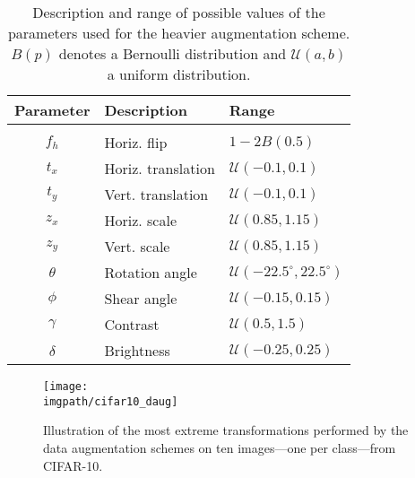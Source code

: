 {\begin{table}[ht]
\begin{center}
\begin{tabular}{cll}
\textbf{Parameter} & \textbf{Description}   & \textbf{Range}                                            \\
\hline \\
$f_h$              & Horiz. flip        & $1 - 2 B(0.5)$                                            \\
$t_x$              & Horiz. translation & $\mathcal{U}(-0.1, 0.1)$                                  \\
$t_y$              & Vert. translation   & $\mathcal{U}(-0.1, 0.1)$                                  \\
$z_x$              & Horiz. scale       & $\mathcal{U}(0.85, 1.15)$                                 \\
$z_y$              & Vert. scale         & $\mathcal{U}(0.85, 1.15)$                                 \\
$\theta$           & Rotation angle         & $\mathcal{U}(-22.5^\circ, 22.5^\circ)$  \\
$\phi$             & Shear angle            & $\mathcal{U}(-0.15, 0.15)$                                \\
$\gamma$           & Contrast               & $\mathcal{U}(0.5, 1.5)$                                   \\
$\delta$           & Brightness             & $\mathcal{U}(-0.25, 0.25)$                                
\end{tabular}
\end{center}
\caption{Description and range of possible values of the parameters used for the heavier augmentation scheme. $B(p)$ denotes a Bernoulli distribution and $\mathcal{U}(a, b)$ a uniform distribution.}
\label{tab:daugreg-heavier_params}
\end{table}

\begin{figure}[htb]
  \begin{center}
    \texttt{[image: \\imgpath/cifar10\_daug]}
  \end{center}
  \caption{Illustration of the most extreme transformations performed by the data augmentation schemes on ten images---one per class---from CIFAR-10.}
  \label{fig:daugreg-cifar10_daug}
\end{figure}

}
